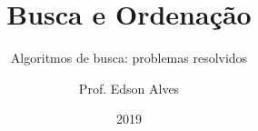 \title{Busca e Ordenação}
\subtitle{Algoritmos de busca: problemas resolvidos}
\date{2019}
\author{Prof. Edson Alves}
